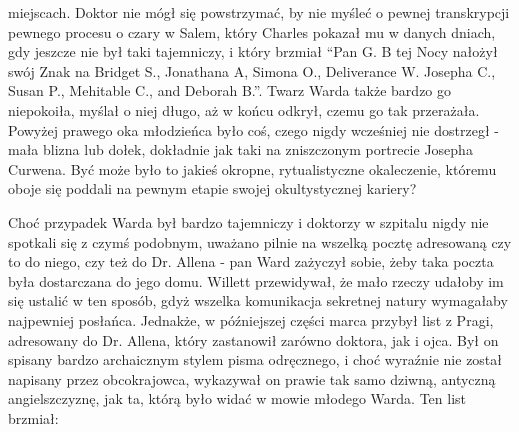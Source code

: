 miejscach. Doktor nie mógł się powstrzymać, by nie myśleć o pewnej transkrypcji pewnego procesu o czary w Salem, który Charles pokazał mu w danych dniach, gdy jeszcze nie był taki tajemniczy, i który brzmiał ``Pan G. B tej Nocy nałożył swój Znak na Bridget S., Jonathana A, Simona O., Deliverance W. Josepha C., Susan P., Mehitable C., and Deborah B.''. Twarz Warda także bardzo go niepokoiła, myślał o niej długo, aż w końcu odkrył, czemu go tak przerażała. Powyżej prawego oka młodzieńca było coś, czego nigdy wcześniej nie dostrzegł - mała blizna lub dołek, dokładnie jak taki na zniszczonym portrecie Josepha Curwena. Być może było to jakieś okropne, rytualistyczne okaleczenie, któremu oboje się poddali na pewnym etapie swojej okultystycznej kariery?

Choć przypadek Warda był bardzo tajemniczy i doktorzy w szpitalu nigdy nie spotkali się z czymś podobnym, uważano pilnie na wszelką pocztę adresowaną czy to do niego, czy też do Dr. Allena - pan Ward zażyczył sobie, żeby taka poczta była dostarczana do jego domu. Willett przewidywał, że mało rzeczy udałoby im się ustalić w ten sposób, gdyż wszelka komunikacja sekretnej natury wymagałaby najpewniej posłańca. Jednakże, w późniejszej części marca przybył list z Pragi, adresowany do Dr. Allena, który zastanowił zarówno doktora, jak i ojca. Był on spisany bardzo archaicznym stylem pisma odręcznego, i choć wyraźnie nie został napisany przez obcokrajowca, wykazywał on prawie tak samo dziwną, antyczną angielszczyznę, jak ta, którą było widać w mowie młodego Warda. Ten list brzmiał:

